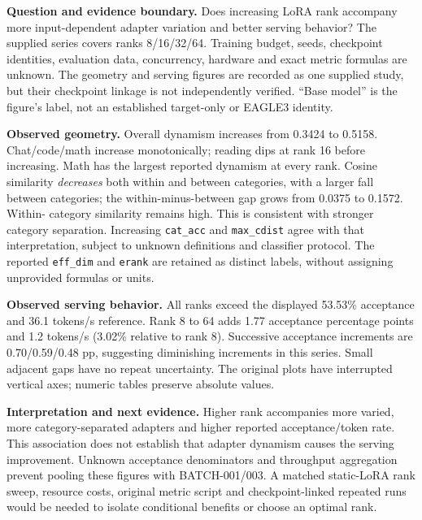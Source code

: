 \textbf{Question and evidence boundary.} Does increasing LoRA rank accompany
more input-dependent adapter variation and better serving behavior? The supplied
series covers ranks 8/16/32/64. Training budget, seeds, checkpoint identities,
evaluation data, concurrency, hardware and exact metric formulas are unknown.
The geometry and serving figures are recorded as one supplied study, but their
checkpoint linkage is not independently verified. ``Base model'' is the figure's
label, not an established target-only or EAGLE3 identity.






\textbf{Observed geometry.} Overall dynamism increases from 0.3424 to 0.5158.
Chat/code/math increase monotonically; reading dips at rank 16 before increasing.
Math has the largest reported dynamism at every rank. Cosine similarity
\emph{decreases} both within and between categories, with a larger fall between
categories; the within-minus-between gap grows from 0.0375 to 0.1572. Within-
category similarity remains high. This is consistent with stronger category
separation. Increasing \texttt{cat\_acc} and \texttt{max\_cdist} agree with that
interpretation, subject to unknown definitions and classifier protocol.
The reported \texttt{eff\_dim} and \texttt{erank} are retained as distinct labels,
without assigning unprovided formulas or units.

\textbf{Observed serving behavior.} All ranks exceed the displayed 53.53\%
acceptance and 36.1 tokens/s reference. Rank 8 to 64 adds 1.77 acceptance
percentage points and 1.2 tokens/s (3.02\% relative to rank 8). Successive
acceptance increments are 0.70/0.59/0.48 pp, suggesting diminishing increments
in this series. Small adjacent gaps have no repeat uncertainty. The original
plots have interrupted vertical axes; numeric tables preserve absolute values.

\textbf{Interpretation and next evidence.} Higher rank accompanies more varied,
more category-separated adapters and higher reported acceptance/token rate.
This association does not establish that adapter dynamism causes the serving
improvement. Unknown acceptance denominators and throughput aggregation prevent
pooling these figures with BATCH-001/003. A matched static-LoRA rank sweep,
resource costs, original metric script and checkpoint-linked repeated runs would
be needed to isolate conditional benefits or choose an optimal rank.
